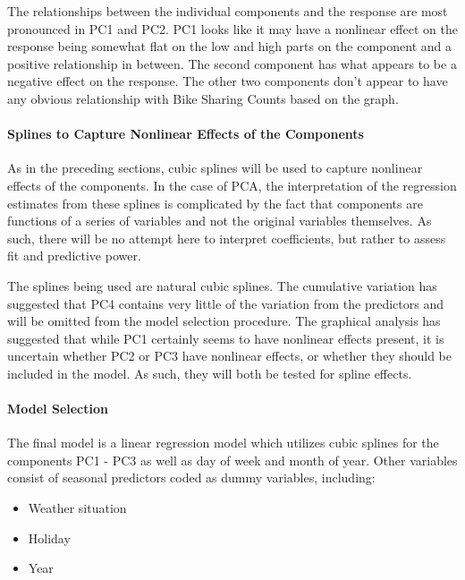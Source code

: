 \documentclass[
]{article}
\begin{document}
The relationships between the individual components and the response are
most pronounced in PC1 and PC2. PC1 looks like it may have a nonlinear
effect on the response being somewhat flat on the low and high parts on
the component and a positive relationship in between. The second
component has what appears to be a negative effect on the response. The
other two components don't appear to have any obvious relationship with
Bike Sharing Counts based on the graph.

\hypertarget{splines-to-capture-nonlinear-effects-of-the-components}{%
\paragraph{Splines to Capture Nonlinear Effects of the
Components}\label{splines-to-capture-nonlinear-effects-of-the-components}}

As in the preceding sections, cubic splines will be used to capture
nonlinear effects of the components. In the case of PCA, the
interpretation of the regression estimates from these splines is
complicated by the fact that components are functions of a series of
variables and not the original variables themselves. As such, there will
be no attempt here to interpret coefficients, but rather to assess fit
and predictive power.

The splines being used are natural cubic splines. The cumulative
variation has suggested that PC4 contains very little of the variation
from the predictors and will be omitted from the model selection
procedure. The graphical analysis has suggested that while PC1 certainly
seems to have nonlinear effects present, it is uncertain whether PC2 or
PC3 have nonlinear effects, or whether they should be included in the
model. As such, they will both be tested for spline effects.

\hypertarget{model-selection-2}{%
\paragraph{Model Selection}\label{model-selection-2}}

The final model is a linear regression model which utilizes cubic
splines for the components PC1 - PC3 as well as day of week and month of
year. Other variables consist of seasonal predictors coded as dummy
variables, including:

\begin{itemize}
\item
  Weather situation
\item
  Holiday
\item
  Year
\end{itemize}
\end{document}
